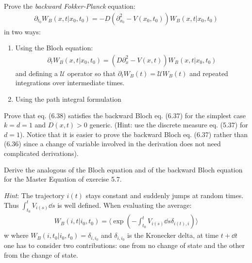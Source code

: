\documentclass[../template.tex]{subfiles}
\begin{document}
\begin{exo}
    Prove the \textit{backward Fokker-Planck} equation:
    \begin{align*}
        \partial_{t_0} W_B(x,t|x_0,t_0) = -D(\partial_{x_0}^2 - V(x_0,t_0)) W_B(x,t|x_0,t_0) 
    \end{align*} 
    in two ways:
    \begin{enumerate}
        \item Using the Bloch equation:
        \begin{align*}
            \partial_t W_B(x,t|x_0,t_0) = (D\partial_x^2 - V(x,t)) W_B(x,t|x_0,t_0)
        \end{align*}
        and defining a $\mathcal{U}$ operator so that $\partial_t W_B(t) = \mathcal{U} W_B(t)$ and repeated integrations over intermediate times.
        \item Using the path integral formulation
    \end{enumerate}    
    
\end{exo}

\begin{exo}
    Prove that eq. (6.38) satisfies the backward Bloch eq. (6.37) for the simplest case $k=d=1$ and $D(x,t) > 0$ generic. (Hint: use the discrete measure eq. (5.37) for $d=1$). Notice that it is easier to prove the backward Bloch eq. (6.37) rather than (6.36) since a change of variable involved in the derivation does not need complicated derivations).
\end{exo}

\setcounter{exo}{4} %

\begin{exo} Derive the analogous of the Bloch equation and of the backward Bloch equation for the Master Equation of exercise 5.7.

    \textit{Hint}: The trajectory $i(t)$ stays constant and suddenly jumps 
    at random times. Thus $\int_{t_0}^t V_{i(s)} \dd{s}$ is well defined. When evaluating the average:
    \begin{align*}
        W_B(i,t|i_0,t_0) = \langle \exp\left(-\int_{t_0}^t V_{i(s)} \dd{s} \delta_{i(t),i}\right) \rangle
    \end{align*}w
    where $W_B(i,t_0|i_0,t_0) = \delta_{i,i_0}$ and $\delta_{i,i_0}$ is the Kronecker delta, at time $t+\dd{t}$ one has to consider two contributions: one from no change of state and the other from the change of state.
\end{exo}

\listoftheorems
\end{document}
